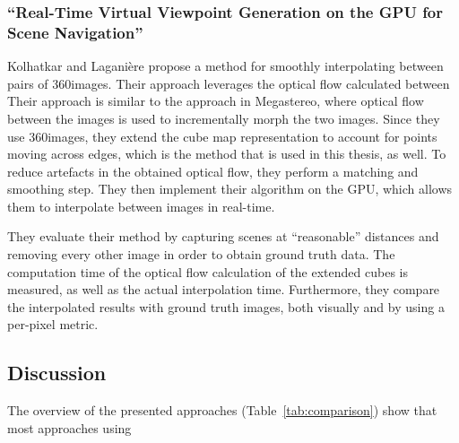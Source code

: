 

\subsubsection{``Real-Time Virtual Viewpoint Generation on the GPU for Scene Navigation'' \cite{360flowblending}}
Kolhatkar and Lagani\`ere \cite{360flowblending} propose a method for smoothly interpolating between pairs of 360\degree images. Their approach leverages the optical flow calculated between 
Their approach is similar to the approach in Megastereo, where optical flow between the images is used to incrementally morph the two images. Since they use 360\degree images, they extend the cube map representation to account for points moving across edges, which is the method that is used in this thesis, as well. To reduce artefacts in the obtained optical flow, they perform a matching and smoothing step. They then implement their algorithm on the GPU, which allows them to interpolate between images in real-time. 

They evaluate their method by capturing scenes at ``reasonable'' distances and removing every other image in order to obtain ground truth data. The computation time of the optical flow calculation of the extended cubes is measured, as well as the actual interpolation time. Furthermore, they compare the interpolated results with ground truth images, both visually and by using a per-pixel metric.

\subsection{Discussion}
The overview of the presented approaches (Table~\ref{tab:comparison}) show that most approaches using 

